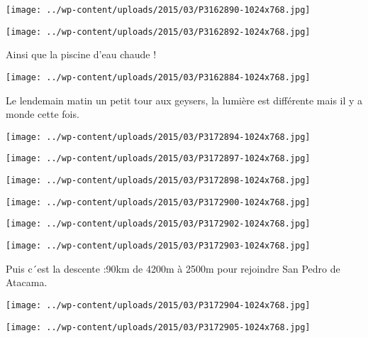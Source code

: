  \newline
 \newline
\centerline{\texttt{[image: ../wp-content/uploads/2015/03/P3162890-1024x768.jpg]} } 
 \newline
 \newline
\centerline{\texttt{[image: ../wp-content/uploads/2015/03/P3162892-1024x768.jpg]} } 
 \newline
 Ainsi que la piscine d'eau chaude ! \newline
 \newline
\centerline{\texttt{[image: ../wp-content/uploads/2015/03/P3162884-1024x768.jpg]} } 
 \newline
 Le lendemain matin un petit tour aux geysers, la lumière est différente mais il y a monde cette fois. \newline
 \newline
\centerline{\texttt{[image: ../wp-content/uploads/2015/03/P3172894-1024x768.jpg]} } 
 \newline
 \newline
\centerline{\texttt{[image: ../wp-content/uploads/2015/03/P3172897-1024x768.jpg]} } 
 \newline
 \newline
\centerline{\texttt{[image: ../wp-content/uploads/2015/03/P3172898-1024x768.jpg]} } 
 \newline
 \newline
\centerline{\texttt{[image: ../wp-content/uploads/2015/03/P3172900-1024x768.jpg]} } 
 \newline
 \newline
\centerline{\texttt{[image: ../wp-content/uploads/2015/03/P3172902-1024x768.jpg]} } 
 \newline
 \newline
\centerline{\texttt{[image: ../wp-content/uploads/2015/03/P3172903-1024x768.jpg]} } 
 \newline
 Puis c´est la descente :90km de 4200m à 2500m pour rejoindre San Pedro de Atacama. \newline
 \newline
\centerline{\texttt{[image: ../wp-content/uploads/2015/03/P3172904-1024x768.jpg]} } 
 \newline
 \newline
\centerline{\texttt{[image: ../wp-content/uploads/2015/03/P3172905-1024x768.jpg]} } 
 \newline
 \newline
